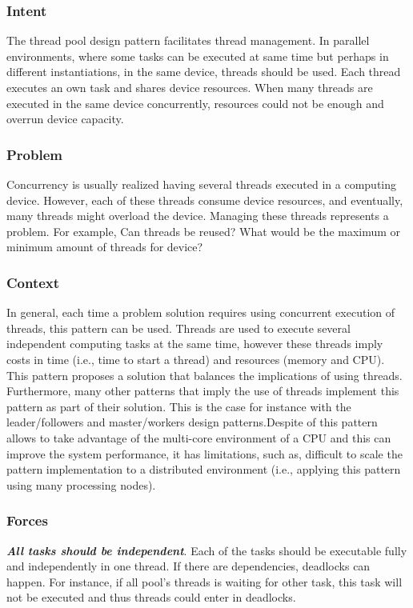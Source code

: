 \subsubsection{Intent}
The thread pool design pattern facilitates thread management. In parallel environments, where some tasks can be executed at same time but perhaps in different instantiations, in the same device, threads should be used. Each thread executes an own task and shares device resources. When many threads are executed in the same device concurrently, resources could not be enough and overrun device capacity. 

\subsubsection{Problem}
Concurrency is usually realized having several threads executed in a computing device. However, each of these threads consume device resources, and eventually, many threads might overload the device. Managing these threads represents a problem. For example, Can threads be reused? What would be the maximum or minimum amount of threads for device?

\subsubsection{Context}
In general, each time a problem solution requires using concurrent execution of threads, this pattern can be used. Threads are used to execute several independent computing tasks at the same time, however these threads imply costs in time (i.e., time to start a thread) and resources (memory and CPU). This pattern proposes a solution that balances the implications of using threads. Furthermore, many other patterns that imply the use of threads implement this pattern as part of their solution. This is the case for instance with the leader/followers and master/workers design patterns.Despite of this pattern allows to take advantage of the multi-core environment of a CPU and this can improve the system performance, it has limitations, such as, difficult to scale the pattern implementation to a distributed environment (i.e., applying this pattern using many processing nodes).

\subsubsection{Forces}
\textbf{\textit{All tasks should be independent}}. Each of the tasks should be executable fully and independently in one thread. If there are dependencies, deadlocks can happen. For instance, if all pool's threads is waiting for other task, this task will not be executed and thus threads could enter in deadlocks.\\

